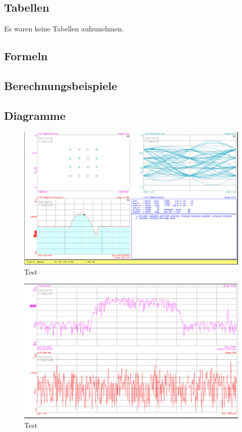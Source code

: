 \documentclass[12pt,a4paper,ngerman]{article}
\begin{document}
\subsection{Tabellen}
Es waren keine Tabellen aufzunehmen. 
\subsection{Formeln}

\subsection{Berechnungsbeispiele}

\subsection{Diagramme}
\begin{figure}[H]
\centering
\includegraphics[width=\textwidth]{figures/Aufgabe2_16QAM.jpg} 
\caption{Test}
\end{figure}

\begin{figure}[H]
\centering
\includegraphics[width=\textwidth]{figures/Aufgabe2_16QAM_1.jpg} 
\caption{Test}
\end{figure}
\end{document}
